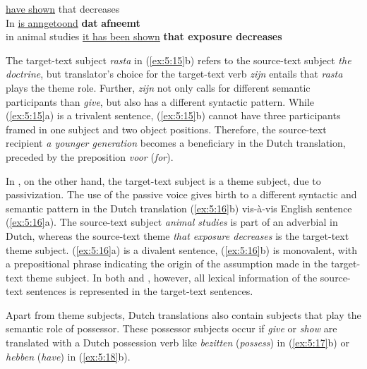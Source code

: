 \documentclass[output=paper]{LSP/langsci}
\begin{document}
\ea \label{ex:5:16}
\ea {} \ul{have shown} that  decreases\\[1em]
\ex
In  \ul{is anngetoond} \textbf{dat}  \textbf{afneemt}\\
in animal studies \ul{it has been shown} \textbf{that exposure decreases}
\z
\z



The target-text subject \textit{rasta} in (\ref{ex:5:15}b) refers to the source-text subject \textit{the doctrine}, but translator’s choice for the target-text verb \textit{zijn} entails that \textit{rasta} plays the theme role. Further, \textit{zijn} not only calls for different semantic participants than \textit{give}, but also has a different syntactic pattern. While (\ref{ex:5:15}a) is a trivalent sentence, (\ref{ex:5:15}b) cannot have three participants framed in one subject and two object positions. Therefore, the source-text recipient \textit{a younger generation} becomes a beneficiary in the Dutch translation, preceded by the preposition \textit{voor} (\textit{for}).

In , on the other hand, the target-text subject is a theme subject, due to passivization. The use of the passive voice gives birth to a different syntactic and semantic pattern in the Dutch translation (\ref{ex:5:16}b) vis-à-vis English sentence (\ref{ex:5:16}a). The source-text subject \textit{animal studies} is part of an adverbial in Dutch, whereas the source-text theme \textit{that exposure decreases} is the target-text theme subject. (\ref{ex:5:16}a) is a divalent sentence, (\ref{ex:5:16}b) is monovalent, with a prepositional phrase indicating the origin of the assumption made in the target-text theme subject. In both  and , however, all lexical information of the source-text sentences is represented in the target-text sentences.    

Apart from theme subjects, Dutch translations also contain subjects that play the semantic role of possessor. These possessor subjects occur if \textit{give} or \textit{show} are translated with a Dutch possession verb like \textit{bezitten} (\textit{possess}) in (\ref{ex:5:17}b) or \textit{hebben} (\textit{have}) in (\ref{ex:5:18}b).  
\end{document}
